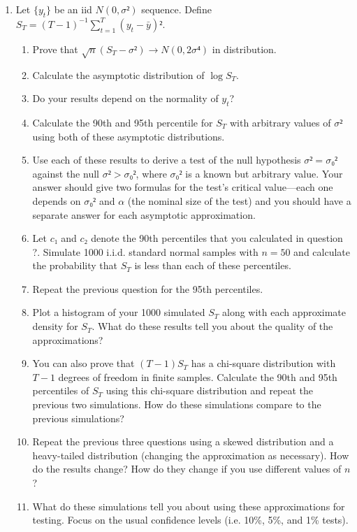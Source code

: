 \begin{enumerate}

\item Let $\{y_t\}$ be an iid $N(0,σ²)$ sequence.  Define $S_T =
  (T-1)^{-1} ∑_{t=1}^T (y_t - \bar y)²$.
  \begin{enumerate}
  \item Prove that $\sqrt{n} (S_T - σ²) → N(0,2σ⁴)$ in
    distribution.
  \item Calculate the asymptotic distribution of $\log S_T$.
  \item Do your results depend on the normality of $y_t$?
  \item Calculate the 90th and 95th percentile for $S_T$ with
    arbitrary values of $σ²$ using both of these asymptotic
    distributions.
  \item Use each of these results to derive a test of the null
    hypothesis $σ² = σ₀²$ against the null $σ² > σ₀²$, where $σ₀²$ is
    a known but arbitrary value.  Your answer should give two formulas
    for the test's critical value---each one depends on $σ₀²$ and $α$
    (the nominal size of the test) and you should have a separate
    answer for each asymptotic approximation.
  \item Let $c₁$ and $c₂$ denote the 90th percentiles that you
    calculated in question ?.  Simulate 1000 i.i.d. standard normal
    samples with $n = 50$ and calculate the probability that $S_T$ is
    less than each of these percentiles.
  \item Repeat the previous question for the 95th percentiles.
  \item Plot a histogram of your 1000 simulated $S_T$ along with each
    approximate density for $S_T$.  What do these results tell you
    about the quality of the approximations?
  \item You can also prove that $(T-1) S_T$ has a chi-square
    distribution with $T-1$ degrees of freedom in finite samples.
    Calculate the 90th and 95th percentiles of $S_T$ using this
    chi-square distribution and repeat the previous two simulations.
    How do these simulations compare to the previous simulations?
  \item Repeat the previous three questions using a skewed
    distribution and a heavy-tailed distribution (changing the
    approximation as necessary).  How do the results change?  How do
    they change if you use different values of $n$?
  \item What do these simulations tell you about using these
    approximations for testing.  Focus on the usual confidence levels
    (i.e. 10\%, 5\%, and 1\% tests).
  \end{enumerate}


\end{enumerate}

